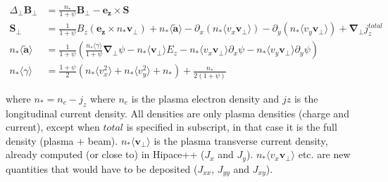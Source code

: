 \documentclass{article}
\begin{document}
\begin{subequations}
\begin{align}
\Delta_\perp \bm{B_\perp} &= \frac{n_*}{1+\psi} \bm{B_\perp} - \bm{e_z} \times \bm{S} \\
\bm{S}_\perp &= \frac{1}{1+\psi} B_z \left( \bm{e_z} \times n_* \bm{v_\perp} \right) + n_* \langle \bm{\tilde{a}} \rangle - \partial_x\left( n_*\langle v_x\bm{v_\perp} \rangle \right) - \partial_y\left( n_*\langle v_y\bm{v_\perp} \rangle \right) + \bm{\nabla_\perp}j_z^{total} \\
n_* \langle \bm{\tilde{a}} \rangle &= \frac{1}{1+\psi} \left(  \frac{n_*\langle\gamma\rangle}{1+\psi}\bm{\nabla_\perp}\psi - n_* \langle \bm{v_\perp} \rangle E_z - n_* \langle v_x\bm{v_\perp}\rangle \partial_x\psi - n_* \langle v_y\bm{v_\perp}\rangle \partial_y\psi \right) \\
n_*\langle \gamma\rangle &= \frac{1+\psi}{2}\left(n_*\langle v_x^2\rangle + n_*\langle v_y^2\rangle + n_*\right) + \frac{n_*}{2(1+\psi)}
\end{align}
\end{subequations}

where $n_* = n_e - j_z$ where $n_e$ is the plasma electron density and $jz$ is the longitudinal current density. All densities are only plasma densities (charge and current), except when $total$ is specified in subscript, in that case it is the full density (plasma + beam). $n_*\langle \bm{v_\perp}\rangle$ is the plasma transverse current density, already computed (or close to) in Hipace++ ($J_x$ and $J_y$). $n_*\langle v_x\bm{v_\perp}\rangle$ etc. are new quantities that would have to be deposited ($J_{xx}$, $J_{yy}$ and $J_{xy}$).
\end{document}
